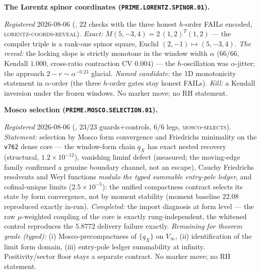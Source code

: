 \par\smallskip\noindent\textbf{The Lorentz spinor coordinates
(\texttt{PRIME.LORENTZ.SPINOR.01}).}
{\sloppy
\emph{Registered} 2026-08-06
(, $22$ checks with the
three honest $h$-order FAILs encoded,
\textsc{lorentz-coords-reveal}).  \emph{Exact:}
$M(5,-3,4)=2\,(1,2)^{T}(1,2)$ --- the compiler triple is a
rank-one spinor square, Euclid $(2,-1)\mapsto(5,-3,4)$.
\emph{The reveal:} the locking slope is strictly monotone in the
window width $\alpha$ ($66/66$, Kendall $1.000$, cross-ratio
contraction CV $0.004$) --- the $h$-oscillation was
$\alpha$-jitter; the approach $2-r\sim\alpha^{-0.23}$ glacial.
\emph{Named candidate:} the 1D monotonicity statement in
$\alpha$-order (the three $h$-order gates stay honest FAILs).
\emph{Kill:} a Kendall inversion under the frozen windows.  No
marker move; no RH statement.\par}


\par\smallskip\noindent\textbf{Mosco selection
(\texttt{PRIME.MOSCO.SELECTION.01}).}
{\sloppy
\emph{Registered} 2026-08-06
(, $23/23$
guards$+$controls, $6/6$ legs, \textsc{mosco-selects}).
\emph{Statement:} selection by Mosco form convergence and
Friedrichs minimality on the \texttt{v762} dense core --- the
window-form chain $q_X$ has exact nested recovery (structural,
$1.2\times10^{-12}$), vanishing liminf defect (measured; the
moving-edge family confirmed a genuine boundary channel, not an
escape), Cauchy Friedrichs resolvents and Weyl functions
\emph{modulo the typed summable entry-pole ledger}, and
cofinal-unique limits ($2.5\times10^{-5}$): the unified
compactness contract selects its state by form convergence, not
by moment stability (moment baseline $22.08$ reproduced exactly
in-run).  \emph{Completed:} the import diagnosis at form level
--- the raw $\mu$-weighted coupling of the core is exactly
rung-independent, the whitened control reproduces the $5.8772$
delivery failure exactly.  \emph{Remaining for theorem grade
(typed):} (i) Mosco-precompactness of $\{q_X\}$ on $V_\infty$,
(ii) identification of the limit form domain, (iii) entry-pole
ledger summability at infinity.  Positivity/sector floor stays a
separate contract.  No marker move; no RH statement.\par}


